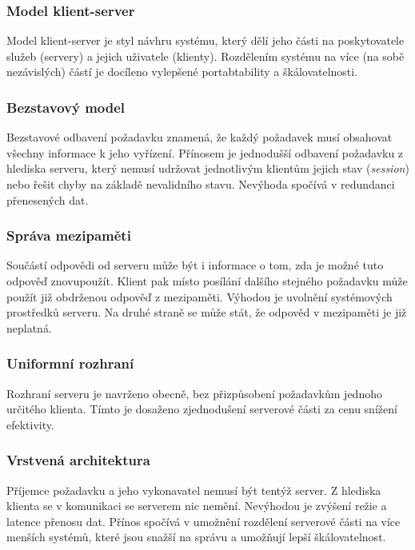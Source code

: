 \subsubsection{Model klient-server}

Model klient-server je styl návhru systému, který dělí jeho části na poskytovatele služeb (servery) a jejich uživatele (klienty).
Rozdělením systému na více (na sobě nezávislých) částí je docíleno vylepšené portabtability a škálovatelnosti.
\cite{rest_klient_server}

\subsubsection{Bezstavový model}

Bezstavové odbavení požadavku znamená, že každý požadavek musí obsahovat všechny informace k jeho vyřízení.
Přínosem je jednodušší odbavení požadavku z hlediska serveru, který nemusí udržovat jednotlivým klientům jejich stav (\textit{session}) nebo řešit chyby na základě nevalidního stavu.
Nevýhoda spočívá v redundanci přenesených dat.
\cite{rest_bezstavovy}

\subsubsection{Správa mezipaměti}

Součástí odpovědi od serveru může být i informace o tom, zda je možné tuto odpověď znovupoužít.
Klient pak místo posílání dalšího stejného požadavku může použít již obdrženou odpověď z mezipaměti.
Výhodou je uvolnění systémových prostředků serveru.
Na druhé straně se může stát, že odpověd v mezipaměti je již neplatná.
\cite{rest_mezipamet}

\subsubsection{Uniformní rozhraní}

Rozhraní serveru je navrženo obecně, bez přizpůsobení požadavkům jednoho určitého klienta.
Tímto je dosaženo zjednodušení serverové části za cenu snížení efektivity.
\cite{rest_uniformni}

\subsubsection{Vrstvená architektura}

Příjemce požadavku a jeho vykonavatel nemusí být tentýž server.
Z hlediska klienta se v komunikaci se serverem nic nemění.
Nevýhodou je zvýšení režie a latence přenosu dat.
Přínos spočívá v umožnění rozdělení serverové části na více menších systémů, které jsou snažší na správu a umožňují lepší škálovatelnost.
\cite{rest_architektura}

